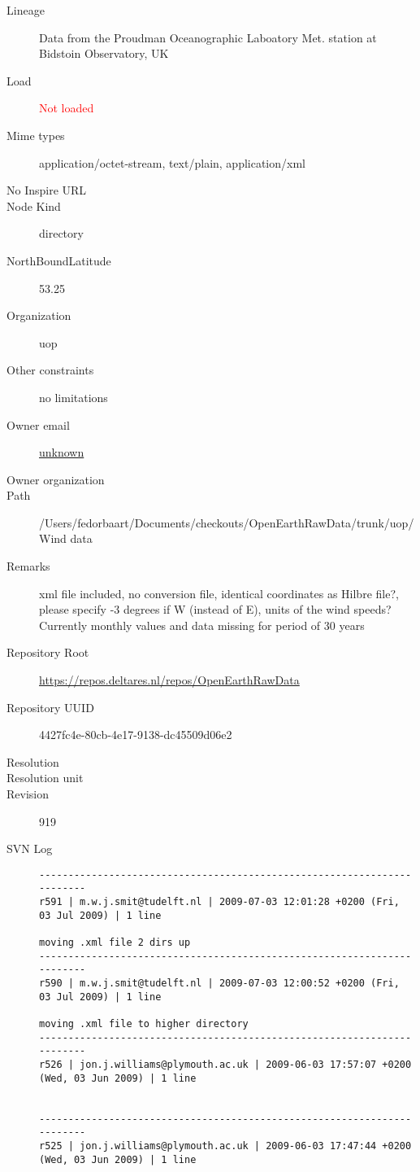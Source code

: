 \documentclass[9]{report}
\begin{document}
\begin{description}
  \item[Lineage] Data from the Proudman Oceanographic Laboatory Met. station at Bidstoin Observatory, UK
  \item[Load] \textcolor{red}{Not loaded}
  \item[Mime types] application/octet-stream, text/plain, application/xml
  \item[No Inspire URL] 
  \item[Node Kind] directory
  \item[NorthBoundLatitude] 53.25
  \item[Organization] uop
  \item[Other constraints] no limitations
  \item[Owner email] \href{mailto:unknown}{unknown}
  \item[Owner organization] 
  \item[Path] /Users/fedorbaart/Documents/checkouts/OpenEarthRawData/trunk/uop/Wind data
  \item[Remarks] xml file included, no conversion file, identical coordinates as Hilbre file?, please specify -3 degrees if W (instead of E), units of the wind speeds? Currently monthly values and data missing for period of 30 years
  \item[Repository Root] \href{https://repos.deltares.nl/repos/OpenEarthRawData}{https://repos.deltares.nl/repos/OpenEarthRawData}
  \item[Repository UUID] 4427fc4e-80cb-4e17-9138-dc45509d06e2
  \item[Resolution] 
  \item[Resolution unit] 
  \item[Revision] 919
  \item[SVN Log] \begin{verbatim}
------------------------------------------------------------------------
r591 | m.w.j.smit@tudelft.nl | 2009-07-03 12:01:28 +0200 (Fri, 03 Jul 2009) | 1 line

moving .xml file 2 dirs up
------------------------------------------------------------------------
r590 | m.w.j.smit@tudelft.nl | 2009-07-03 12:00:52 +0200 (Fri, 03 Jul 2009) | 1 line

moving .xml file to higher directory
------------------------------------------------------------------------
r526 | jon.j.williams@plymouth.ac.uk | 2009-06-03 17:57:07 +0200 (Wed, 03 Jun 2009) | 1 line


------------------------------------------------------------------------
r525 | jon.j.williams@plymouth.ac.uk | 2009-06-03 17:47:44 +0200 (Wed, 03 Jun 2009) | 1 line



\end{verbatim}
\end{description}
\end{document}
